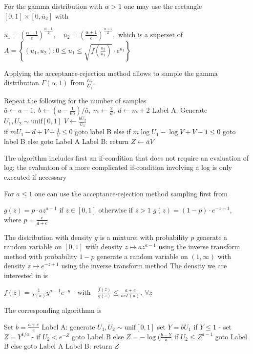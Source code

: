 For the gamma distribution with \(\alpha > 1\) one may use the rectangle \([0, 1] \times [0, \overline{u}_2]\) with

\(\overline{u}_1 = \left( \frac{\alpha - 1}{e} \right)^{\frac{\alpha - 1}{2}}, \quad \overline{u}_2 = \left( \frac{\alpha + 1}{e} \right)^{\frac{\alpha + 1}{2}},\)
which is a superset of
\(A = \left\{ (u_1, u_2) : 0 \leq u_1 \leq \sqrt{f \left( \frac{u_2}{u_1} \right)} \cdot e^{u_1} \right\}\)

 Applying the acceptance-rejection method allows to sample the gamma distribution \(\Gamma(\alpha, 1)\) from \(\frac{U_2}{U_1}\).

Repeat the following for the number of samples
\( \bar{a} \leftarrow a-1, \ b \leftarrow \left( a - \frac{1}{6a} \right) / \bar{a}, \ m \leftarrow \frac{2}{a}, \ d \leftarrow m+2 \)
Label A:
Generate \( U_1, U_2 \sim \text{unif}[0, 1] \)
\( V \leftarrow \frac{b U_2}{U_1} \) \\
if \( m U_1 - d + V + \frac{1}{V} \leq 0 \) goto label B
else if \( m \log U_1 - \log V + V - 1 \leq 0 \) goto label B
else goto Label A
Label B:
return \( Z \leftarrow \bar{a} V \)

The algorithm includes first an if-condition that does not require an evaluation of log; the evaluation of a more
complicated if-condition involving a log is only executed if necessary

For \( a \leq 1 \) one can use the acceptance-rejection method sampling first from

\( g(z) = p \cdot a z^{a-1}\) if \( z \in [0, 1] \)
otherwise if \( z > 1 \) \( g(z) = (1-p) \cdot e^{-z+1}\),
where \( p = \frac{e}{a + e} \)

The distribution with density \(g\) is a mixture:
with probability \(p\) generate a random variable on \([0, 1]\) with density \(z \mapsto a z^{a-1}\) using the inverse transform method
with probability \(1-p\) generate a random variable on \((1, \infty)\) with density \(z \mapsto e^{-z+1}\) using the inverse transform method
The density we are interested in is

\( f(z) = \frac{1}{\Gamma(a)} y^{a-1} e^{-y} \quad \text{with} \quad \frac{f(z)}{g(z)} \leq \frac{a + e}{ae \Gamma(a)},\ \forall z \)

The corresponding algorithmn is

Set \( b = \frac{a+e}{e} \)
Label A:
generate \( U_1, U_2 \sim \text{unif}[0, 1] \)
set \( Y = b U_1 \)
if \( Y \leq 1 \)
- set \( Z = Y^{1/a} \)
- if \( U_2 < e^{-Z} \) goto Label B
else \( Z = -\log(\frac{b - Y}{a} \)
if \( U_{2} \leq Z^{a-1} \) goto Label B
else goto Label A
Label B:
return \( Z \)


